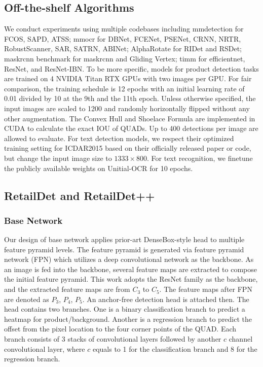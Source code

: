 \documentclass[runningheads]{llncs}
\begin{document}
\subsection{Off-the-shelf Algorithms}
We conduct experiments using multiple codebases including mmdetection \cite{mmdetection} for FCOS, SAPD, ATSS; mmocr \cite{mmocr2021} for DBNet, FCENet, PSENet, CRNN, NRTR, RobustScanner, SAR, SATRN, ABINet; AlphaRotate \cite{yang2021alpharotate} for RIDet and RSDet; maskrcnn benchmark\cite{massa2018maskrcnn_benchmark} for maskrcnn and Gliding Vertex; timm \cite{rw2019timm} for efficientnet, ResNet, and ResNet-IBN. To be more specific, models for product detection tasks are trained on 4 NVIDIA Titan RTX GPUs with two images per GPU. For fair comparison, the training schedule is 12 epochs with an initial learning rate of 0.01 divided by 10 at the 9th and the 11th epoch. Unless otherwise specified, the input images are scaled to 1200 and randomly horizontally flipped without any other augmentation. The Convex Hull and Shoelace Formula are implemented in CUDA to calculate the exact IOU of QUADs. Up to 400 detections per image are allowed to evaluate. For text detection models, we respect their optimized training setting for ICDAR2015 based on their officially released paper or code, but change the input image size to $1333 \times 800$. For text recognition, we finetune the publicly available weights on Unitial-OCR for 10 epochs.

\subsection{RetailDet and RetailDet++}
\subsubsection{Base Network}
Our design of base network applies prior-art DenseBox-style head \cite{densebox} to multiple feature pyramid levels. The feature pyramid is generated via feature pyramid network (FPN) \cite{lin2016feature} which utilizes a deep convolutional network as the backbone. As an image is fed into the backbone, several feature maps are extracted to compose the initial feature pyramid. This work adopts the ResNet family as the backbone, and the extracted feature maps are from $C_3$ to $C_5$. The feature maps after FPN are denoted as $P_3$, $P_4$, $P_5$. An anchor-free detection head is attached then. The head contains two branches. One is a binary classification branch to predict a heatmap for product/background. Another is a regression branch to predict the offset from the pixel location to the four corner points of the QUAD. Each branch consists of 3 stacks of convolutional layers followed by another $c$ channel convolutional layer, where $c$ equals to 1 for the classification branch and 8 for the regression branch.
\end{document}
